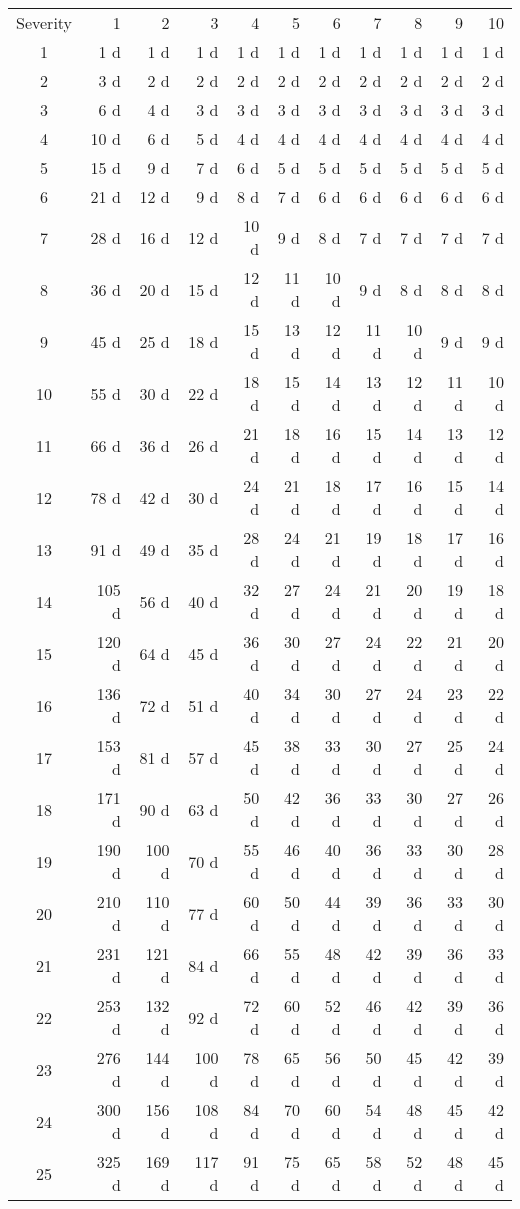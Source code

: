 \begin{tabular}{c|rrrrrrrrrr}
    Severity & 1 & 2 & 3 & 4 & 5 & 6 & 7 & 8 & 9 & 10\\
    1 &  1 d & 1 d & 1 d & 1 d & 1 d & 1 d & 1 d & 1 d & 1 d & 1 d\\
    2 &  3 d & 2 d & 2 d & 2 d & 2 d & 2 d & 2 d & 2 d & 2 d & 2 d\\
    3 &  6 d & 4 d & 3 d & 3 d & 3 d & 3 d & 3 d & 3 d & 3 d & 3 d\\
    4 &  10 d & 6 d & 5 d & 4 d & 4 d & 4 d & 4 d & 4 d & 4 d & 4 d\\
    5 &  15 d & 9 d & 7 d & 6 d & 5 d & 5 d & 5 d & 5 d & 5 d & 5 d\\
    6 &  21 d & 12 d & 9 d & 8 d & 7 d & 6 d & 6 d & 6 d & 6 d & 6 d\\
    7 &  28 d & 16 d & 12 d & 10 d & 9 d & 8 d & 7 d & 7 d & 7 d & 7 d\\
    8 &  36 d & 20 d & 15 d & 12 d & 11 d & 10 d & 9 d & 8 d & 8 d & 8 d\\
    9 &  45 d & 25 d & 18 d & 15 d & 13 d & 12 d & 11 d & 10 d & 9 d & 9 d\\
    10 &  55 d & 30 d & 22 d & 18 d & 15 d & 14 d & 13 d & 12 d & 11 d & 10 d\\
    11 &  66 d & 36 d & 26 d & 21 d & 18 d & 16 d & 15 d & 14 d & 13 d & 12 d\\
    12 &  78 d & 42 d & 30 d & 24 d & 21 d & 18 d & 17 d & 16 d & 15 d & 14 d\\
    13 &  91 d & 49 d & 35 d & 28 d & 24 d & 21 d & 19 d & 18 d & 17 d & 16 d\\
    14 &  105 d & 56 d & 40 d & 32 d & 27 d & 24 d & 21 d & 20 d & 19 d & 18 d\\
    15 &  120 d & 64 d & 45 d & 36 d & 30 d & 27 d & 24 d & 22 d & 21 d & 20 d\\
    16 &  136 d & 72 d & 51 d & 40 d & 34 d & 30 d & 27 d & 24 d & 23 d & 22 d\\
    17 &  153 d & 81 d & 57 d & 45 d & 38 d & 33 d & 30 d & 27 d & 25 d & 24 d\\
    18 &  171 d & 90 d & 63 d & 50 d & 42 d & 36 d & 33 d & 30 d & 27 d & 26 d\\
    19 &  190 d & 100 d & 70 d & 55 d & 46 d & 40 d & 36 d & 33 d & 30 d & 28 d\\
    20 &  210 d & 110 d & 77 d & 60 d & 50 d & 44 d & 39 d & 36 d & 33 d & 30 d\\
    21 &  231 d & 121 d & 84 d & 66 d & 55 d & 48 d & 42 d & 39 d & 36 d & 33 d\\
    22 &  253 d & 132 d & 92 d & 72 d & 60 d & 52 d & 46 d & 42 d & 39 d & 36 d\\
    23 &  276 d & 144 d & 100 d & 78 d & 65 d & 56 d & 50 d & 45 d & 42 d & 39 d\\
    24 &  300 d & 156 d & 108 d & 84 d & 70 d & 60 d & 54 d & 48 d & 45 d & 42 d\\
    25 &  325 d & 169 d & 117 d & 91 d & 75 d & 65 d & 58 d & 52 d & 48 d & 45 d\\
\end{tabular}
